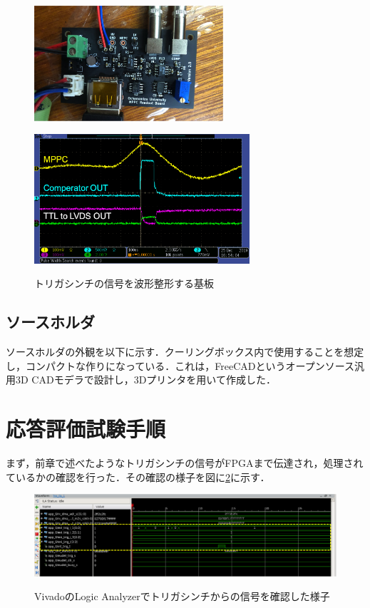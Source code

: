 \begin{figure}[h]
  \centering
  \begin{minipage}[b]{0.45\linewidth}
    \centering
    \includegraphics[width=7cm]{./figure/pcb.png}
    \label{fig:pcb}
  \end{minipage}
  \begin{minipage}[b]{0.45\linewidth}
    \centering
    \includegraphics[width=8cm]{./figure/pcbosiro.png}
    \label{fig:extosiro}
  \end{minipage}
  \caption{トリガシンチの信号を波形整形する基板}
\end{figure}



\subsection{ソースホルダ}
ソースホルダの外観を以下に示す．クーリングボックス内で使用することを想定し，コンパクトな作りになっている．これは，FreeCADというオープンソース汎用3D CADモデラで設計し，3Dプリンタを用いて作成した．

\section{応答評価試験手順}
まず，前章で述べたようなトリガシンチの信号がFPGAまで伝達され，処理されているかの確認を行った．その確認の様子を図に\ref{fig:extwf}に示す．

\begin{figure}[h]
  \centering
  \includegraphics[width=17cm]{./figure/extWF.png}
  \label{fig:extwf}
  \caption{VivadoのLogic Analyzerでトリガシンチからの信号を確認した様子}
\end{figure}

